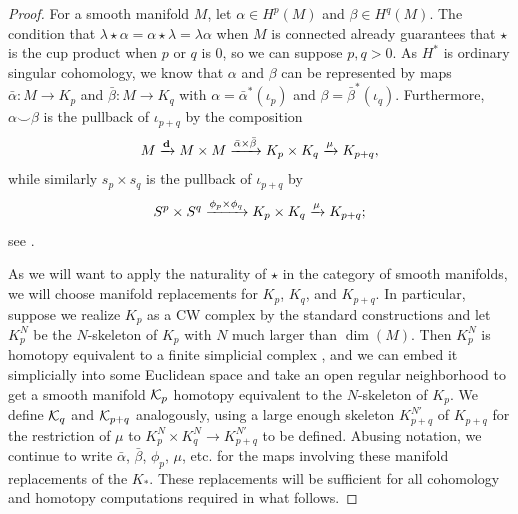 \begin{proof}
	For a smooth manifold $M$, let $\alpha \in H^p(M)$ and $\beta \in H^q(M)$.
	The condition that $\lambda\star \alpha = \alpha\star \lambda = \lambda\alpha$ when $M$ is connected already guarantees that $\star$ is the cup product when $p$ or $q$ is $0$, so we can suppose $p,q>0$.
	As $H^*$ is ordinary singular cohomology, we know that $\alpha$ and $\beta$ can be represented by maps $\bar \alpha \colon M \to K_p$ and $\bar\beta \colon M \to K_q$ with $\alpha = \bar \alpha^*(\iota_p)$ and $\beta = \bar\beta^*(\iota_q)$.
	Furthermore, $\alpha\smile \beta$ is the pullback of $\iota_{p+q}$ by the composition
	\begin{equation}\label{E: EM cross}
		M \xrightarrow{\mathbf{d}} M \times M \xrightarrow{\bar\alpha \times \bar \beta} K_p \times K_q \xrightarrow{\mu} K_{p+q},
	\end{equation}
	while similarly $s_p \times s_q$ is the pullback of $\iota_{p+q}$ by
	\begin{equation}\label{E: sphere cross}
		S^p \times S^q \xrightarrow{\phi_p \times \phi_q} K_p \times K_q \xrightarrow{\mu} K_{p+q};
	\end{equation}
	see \cite[Section 4.3]{Hatc02}.

	As we will want to apply the naturality of $\star$ in the category of smooth manifolds, we will choose manifold replacements for $K_p$, $K_q$, and $K_{p+q}$.
	In particular, suppose we realize $K_p$ as a CW complex by the standard constructions and let $K_p^N$ be the $N$-skeleton of $K_p$ with $N$ much larger than $\dim(M)$.
	Then $K_p^N$ is homotopy equivalent to a finite simplicial complex \cite[Theorem 2C.5]{Hatc02}, and we can embed it simplicially into some Euclidean space and take an open regular neighborhood to get a smooth manifold $\mathcal{K}_p$ homotopy equivalent to the $N$-skeleton of $K_p$.
	We define $\mathcal{K}_q$ and $\mathcal{K}_{p+q}$ analogously, using a large enough skeleton $K^{N'}_{p+q}$ of $K_{p+q}$ for the restriction of $\mu$ to $K_p^N \times K_q^N \to K_{p+q}^{N'}$ to be defined.
	Abusing notation, we continue to write $\bar \alpha$, $\bar \beta$, $\phi_p$, $\mu$, etc.
	for the maps involving these manifold replacements of the $K_*$.
	These replacements will be sufficient for all cohomology and homotopy computations required in what follows.


\end{proof}
